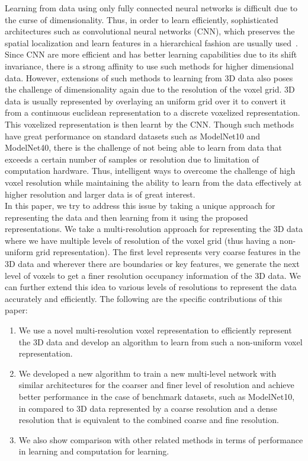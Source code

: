 \documentclass[10pt,letterpaper]{article}
\begin{document}
Learning from data using only fully connected neural networks is difficult due to the curse of dimensionality. Thus, in order to learn efficiently, sophisticated architectures such as convolutional neural networks (CNN), which preserves the spatial localization and learn features in a hierarchical fashion are usually used~\citep{ioannidou2017deep,7353481}. Since CNN are more efficient and has better learning capabilities due to its shift invariance, there is a strong affinity to use such methods for higher dimensional data. However, extensions of such methods to learning from 3D data also poses the challenge of dimensionality again due to the resolution of the voxel grid. 3D data is usually represented by overlaying an uniform grid over it to convert it from a continuous euclidean representation to a discrete voxelized representation. This voxelized representation is then learnt by the CNN. Though such methods have great performance on standard datasets such as ModelNet10 and ModelNet40, there is the challenge of not being able to learn from data that exceeds a certain number of samples or resolution due to limitation of computation hardware. Thus, intelligent ways to overcome the challenge of high voxel resolution while maintaining the ability to learn from the data effectively at higher resolution and larger data is of great interest.\\

In this paper, we try to address this issue by taking a unique approach for representing the data and then learning from it using the proposed representations. We take a multi-resolution approach for representing the 3D data where we have multiple levels of resolution of the voxel grid (thus having a non-uniform grid representation). The first level represents very coarse features in the 3D data and wherever there are boundaries or key features, we generate the next level of voxels to get a finer resolution occupancy information of the 3D data. We can further extend this idea to various levels of resolutions to represent the data accurately and efficiently. The following are the specific contributions of this paper:

\begin{enumerate}
\setlength\itemsep{0.0em}
\item We use a novel multi-resolution voxel representation to efficiently represent the 3D data and develop an algorithm to learn from such a non-uniform voxel representation.
\item We developed a new algorithm to train a new multi-level network with similar architectures for the coarser and finer level of resolution and achieve better performance in the case of benchmark datasets, such as ModelNet10, in compared to 3D data represented by a coarse resolution and a dense resolution that is equivalent to the combined coarse and fine resolution.
\item We also show comparison with other related methods in terms of performance in learning and computation for learning.
\end{enumerate}
\end{document}
